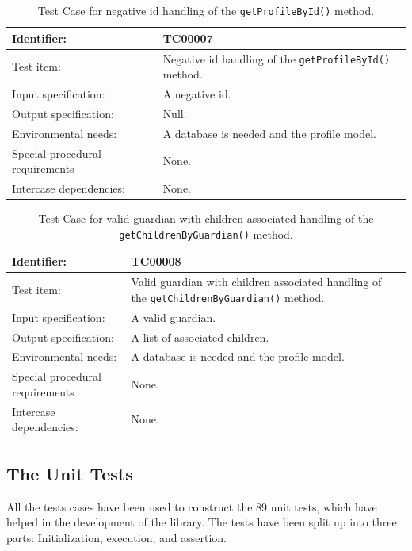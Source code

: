 \begin{table}[htbp]
	\centering
		\begin{tabular}{| p{4.5cm} | m{9cm} |}
			\hline
			Identifier: 					& TC00007 \\ \hline
			Test item:						& Negative id handling of the \texttt{getProfileById()} method. \\ \hline
			Input specification:			& A negative id. \\ \hline
			Output specification: 			& Null. \\ \hline
			Environmental needs:			& A database is needed and the profile model. \\ \hline
			Special procedural requirements	& None. \\ \hline
			Intercase dependencies:			& None. \\ \hline
		\end{tabular}
	\caption{Test Case for negative id handling of the \texttt{getProfileById()} method.}
	\label{tab:TestCase_NegativeIdHandling}
\end{table}

\begin{table}[htbp]
	\centering
		\begin{tabular}{| p{4.5cm} | m{9cm} |}
			\hline
			Identifier: 					& TC00008 \\ \hline
			Test item:						& Valid guardian with children associated handling of the \texttt{getChildrenByGuardian()} method. \\ \hline
			Input specification:			& A valid guardian. \\ \hline
			Output specification: 			& A list of associated children. \\ \hline
			Environmental needs:			& A database is needed and the profile model. \\ \hline
			Special procedural requirements	& None. \\ \hline
			Intercase dependencies:			& None. \\ \hline
		\end{tabular}
	\caption{Test Case for valid guardian with children associated handling of the \texttt{getChildrenByGuardian()} method.}
	\label{tab:TestCase_ValidGuardianWithChildrenAssociatedHandling}
\end{table}


\subsection{The Unit Tests}
All the tests cases have been used to construct the 89 unit tests, which have helped in the development of the library.
The tests have been split up into three parts: Initialization, execution, and assertion.

